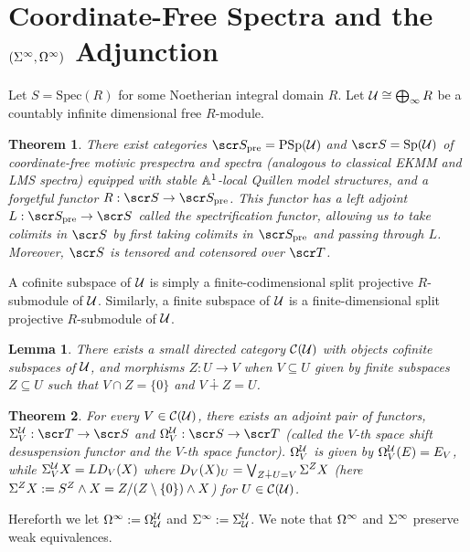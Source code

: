 \documentclass{amsart}
\newtheorem{thm}{Theorem}[section]
\newtheorem{lem}{Lemma}[section]
\theoremstyle{definition}
\begin{document}
\section{Coordinate-Free Spectra and the $(\Sigma^{\infty}, \Omega^{\infty})$ Adjunction}\label{sec:assna1}
Let $S=\mathrm{Spec}(R)$ for some Noetherian integral domain $R$. Let ${\mathcal{U}} \cong \bigoplus_{\infty}R$ be a countably infinite dimensional free $R$-module. 
\begin{thm}
There exist categories $\sS_{\mathrm{pre}}=\mathrm{PSp}(\oU)$ and $\sS = \mathrm{Sp}(\oU)$ of coordinate-free motivic prespectra and spectra (analogous to classical EKMM and LMS spectra) equipped with stable $\mathbb{A}^1$-local Quillen model structures, and a forgetful functor $R : \sS \to \sS_{\mathrm{pre}}$. This functor has a left adjoint $L : \sS_{\mathrm{pre}} \to \sS$ called the spectrification functor, allowing us to take colimits in $\sS$ by first taking colimits in $\sS_{\mathrm{pre}}$ and passing through $L$. Moreover, $\sS$ is tensored and cotensored over $\sT$.
\end{thm}

A cofinite subspace of ${\mathcal{U}}$ is simply a finite-codimensional split projective $R$-submodule of ${\mathcal{U}}$. Similarly, a finite subspace of ${\mathcal{U}}$ is a finite-dimensional split projective $R$-submodule of ${\mathcal{U}}$. 

\begin{lem}
There exists a small directed category ${\mathcal{C}} ({\mathcal{U}})$ with objects cofinite subspaces of ${\mathcal{U}}$, and morphisms $Z : U \to V$ when $V \subseteq U$ given by finite subspaces $Z \subseteq U$ such that $V \cap Z = \{0\}$ and $V \dotplus Z = U$.
\end{lem}

\begin{thm}
For every $V \in {\mathcal{C}} ({\mathcal{U}})$, there exists an adjoint pair of functors, $\SI_{V}^{\oU} : \sT \to \sS$ and $\OM_{V}^{\oU} : \sS \to \sT$ (called the $V$-th space shift desuspension functor and the $V$-th space functor). $\Omega_V^{{\mathcal{U}}}$ is given by $\Omega_V^{{\mathcal{U}}}(E) = E_V$, while $\Sigma_V^{{\mathcal{U}}}X=LD_V(X)$ where $D_V(X)_{U} = \bigvee_{Z \dotplus U = V} \Sigma^Z X$ (here $\Sigma^ZX := S^Z \land X = Z/(Z\setminus\{0\}) \land X$) for $U \in {\mathcal{C}}({\mathcal{U}})$.
\end{thm}

\noindent Hereforth we let $\Omega^{\infty} := \Omega_{{\mathcal{U}}}^{{\mathcal{U}}}$ and $\Sigma^{\infty} := \Sigma_{{\mathcal{U}}}^{{\mathcal{U}}}$. We note that $\Omega^{\infty}$ and $\Sigma^{\infty}$ preserve weak equivalences.
\end{document}

